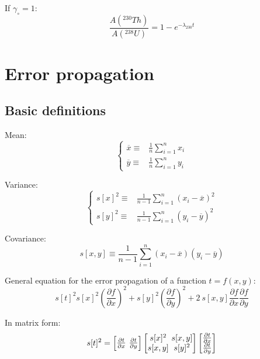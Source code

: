 \documentclass{article}
\begin{document}
\begin{multicols}{3}
If $\gamma_\circ = 1$:
\begin{equation}
\frac{A(^{230}Th)}{A(^{238}U)} = 1-e^{-\lambda_{230}t}
\label{eq:230238b}
\end{equation}

\section{Error propagation}
\label{ch:error-propagation}

\subsection{Basic definitions}
\label{sec:summarystatistics}

Mean:
\begin{equation}
\left\{
\begin{array}{rl}
\overline{x} \equiv & \frac{1}{n} \sum_{i=1}^{n} x_i\\
\overline{y} \equiv & \frac{1}{n} \sum_{i=1}^{n} y_i
\end{array}
\right.
\label{eq:mean}
\end{equation}

Variance:
\begin{equation}
\left\{
\begin{array}{rl}
s[x]^2 \equiv & \frac{1}{n-1} \sum_{i=1}^{n} (x_i-\overline{x})^2\\
s[y]^2 \equiv & \frac{1}{n-1} \sum_{i=1}^{n} (y_i-\overline{y})^2
\end{array}
\right.
\label{eq:variance}
\end{equation}

Covariance:
\begin{equation}
s[x,y] \equiv \frac{1}{n-1} \sum_{i=1}^{n} (x_i-\overline{x})(y_i-\overline{y})
\label{eq:covariance}
\end{equation}

General equation for the error propagation of a function $t=f(x,y)$:
\begin{equation}
s[t]^2 s[x]^2 \left(\frac{\partial f}{\partial x}\right)^2 +
s[y]^2 \left(\frac{\partial f}{\partial y}\right)^2 +
2~s[x,y] \frac{\partial f}{\partial x} \frac{\partial f}{\partial y} \label{eq:s2t}
\end{equation}

In matrix form:
\begin{equation}
s[t]^2 = 
\left[
\begin{array}{@{}c@{~}c@{}}
\frac{\partial t}{\partial x}&\frac{\partial t}{\partial y}
\end{array}
\right]
\left[
\begin{array}{@{}c@{~}c@{}}
s[x]^2 & s[x,y]\\
s[x,y] & s[y]^2
\end{array}
\right]
\left[
\begin{array}{@{}c@{}}
\frac{\partial t}{\partial x} \\
\frac{\partial t}{\partial y}
\end{array}
\right]
\label{eq:s2tmatrix}
\end{equation}


\end{multicols}
\end{document}
